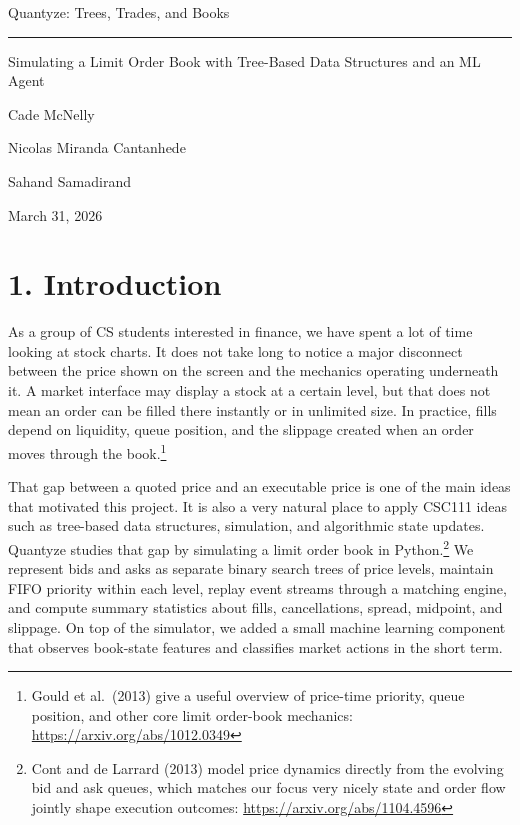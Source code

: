 \documentclass[11pt]{article}
\newcommand{\projectname}{Quantyze}
\newcommand{\projecttitle}{Trees, Trades, and Books}
\newcommand{\projectsubtitle}{Simulating a Limit Order Book with Tree-Based Data Structures and an ML Agent}
\newcommand{\projectdate}{March 31, 2026}
\begin{document}
\begin{center}
{\Huge \projectname: \projecttitle\par}
\vspace{0.8em}
\noindent\rule{0.82\textwidth}{0.6pt}\par
\vspace{0.9em}
{\large\itshape\parbox{0.9\textwidth}{\centering \projectsubtitle}\par}
\vspace{1.4em}
\begin{minipage}[t]{0.31\textwidth}
\centering
\large Cade McNelly
\end{minipage}
\hfill
\begin{minipage}[t]{0.31\textwidth}
\centering
\large Nicolas Miranda Cantanhede
\end{minipage}
\hfill
\begin{minipage}[t]{0.31\textwidth}
\centering
\large Sahand Samadirand
\end{minipage}

\vspace{1.2em}
{\large \projectdate\par}
\end{center}
\vspace{1.2em}

\section*{1. Introduction}
As a group of CS students interested in finance, we have spent a lot of time
looking at stock charts. It does not take long to notice a major disconnect
between the price shown on the screen and the mechanics operating underneath
it. A market interface may display a stock at a certain level, but that does
not mean an order can be filled there instantly or in unlimited size. In
practice, fills depend on liquidity, queue position, and the slippage created
when an order moves through the book.\footnote{Gould et al.\ (2013) give a
useful overview of price-time priority, queue position, and other core limit
order-book mechanics:
\url{https://arxiv.org/abs/1012.0349}}

That gap between a quoted price and an executable price is one of the main
ideas that motivated this project. It is also a very natural place to apply
CSC111 ideas such as tree-based data structures, simulation, and algorithmic
state updates. Quantyze studies that gap by simulating a limit order book in
Python.\footnote{Cont and de Larrard (2013) model price dynamics directly from
the evolving bid and ask queues, which matches our focus very nicely
state and order flow jointly shape execution outcomes:
\url{https://arxiv.org/abs/1104.4596}} We represent bids and asks as separate binary search trees of
price levels, maintain FIFO priority within each level, replay event streams
through a matching engine, and compute summary statistics about fills,
cancellations, spread, midpoint, and slippage. On top of the simulator, we
added a small machine learning component that observes book-state
features and classifies market actions in the short term.
\end{document}

